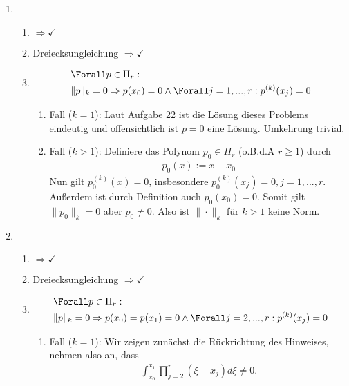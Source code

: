 \begin{solution}
\begin{enumerate}[label = \textbf{\alph*)}]
  \item
  \begin{enumerate}[label = \textit{\roman*)}]
    \item {} $\Rightarrow \checkmark$
    \item Dreiecksungleichung $\Rightarrow \checkmark$
    \item {} \begin{align*}
      &\Forall p \in \Pi_r: \\
      & \|p\|_k = 0 \Rightarrow p(x_0) = 0 \land \Forall j=1,...,r: p^{(k)}(x_j) = 0
    \end{align*}
    \begin{enumerate}[label = \textit{\arabic*.}]
      \item Fall ($k=1$):
      Laut Aufgabe 22 ist die Lösung dieses Problems eindeutig und offensichtlich ist $p = 0$ eine Lösung.
      Umkehrung trivial.
      \item Fall ($k>1$):
      Definiere das Polynom $p_0 \in \Pi_r$ (o.B.d.A $r \geq 1$) durch
      \begin{align*}
        p_0(x) := x-x_0
      \end{align*}
      Nun gilt $p_0^{(k)}(x) = 0$, insbesondere $p_0^{(k)}(x_j) = 0, j=1,...,r$. Außerdem ist durch Definition auch $p_0(x_0) = 0$.
      Somit gilt $\|p_0\|_k = 0$ aber $p_0 \neq 0$. Also ist $\|\cdot\|_k$ für $k>1$ keine Norm.
    \end{enumerate}
  \end{enumerate}
  \item
  \begin{enumerate}[label = \textit{\roman*)}]
    \item {} $\Rightarrow \checkmark$
    \item Dreiecksungleichung $\Rightarrow \checkmark$
    \item {} \begin{align*}
      &\Forall p \in \Pi_r: \\
      & \|p\|_k = 0 \Rightarrow p(x_0) = p(x_1) = 0 \land \Forall j=2,...,r: p^{(k)}(x_j) = 0
    \end{align*}
    \begin{enumerate}[label = \textit{\arabic*.}]
      \item Fall ($k=1$):
      Wir zeigen zunächst die Rückrichtung des Hinweises, nehmen also an, dass
      \begin{align*}
        \int_{x_0}^{x_1} \prod_{j=2}^r \left(\xi - x_j\right)d\xi \neq 0.

\end{align*}
\end{enumerate}
\end{enumerate}
\end{enumerate}
\end{solution}
